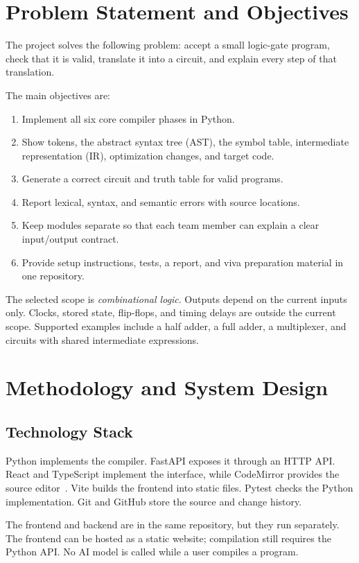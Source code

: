 \documentclass[conference]{IEEEtran}
\begin{document}
\section{Problem Statement and Objectives}
The project solves the following problem: accept a small logic-gate program, check that it is valid, translate it into a circuit, and explain every step of that translation.

The main objectives are:
\begin{enumerate}
\item Implement all six core compiler phases in Python.
\item Show tokens, the abstract syntax tree (AST), the symbol table, intermediate representation (IR), optimization changes, and target code.
\item Generate a correct circuit and truth table for valid programs.
\item Report lexical, syntax, and semantic errors with source locations.
\item Keep modules separate so that each team member can explain a clear input/output contract.
\item Provide setup instructions, tests, a report, and viva preparation material in one repository.
\end{enumerate}

The selected scope is \emph{combinational logic}. Outputs depend on the current inputs only. Clocks, stored state, flip-flops, and timing delays are outside the current scope. Supported examples include a half adder, a full adder, a multiplexer, and circuits with shared intermediate expressions.

\section{Methodology and System Design}
\subsection{Technology Stack}
Python implements the compiler. FastAPI exposes it through an HTTP API. React and TypeScript implement the interface, while CodeMirror provides the source editor~\cite{codemirror}. Vite builds the frontend into static files. Pytest checks the Python implementation. Git and GitHub store the source and change history.

The frontend and backend are in the same repository, but they run separately. The frontend can be hosted as a static website; compilation still requires the Python API. No AI model is called while a user compiles a program.
\end{document}
